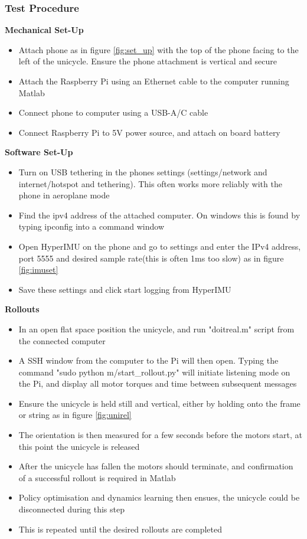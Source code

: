 \documentclass[twoside,twocolumn,12pt]{article}
\begin{document}
\subsubsection{Test Procedure}

\textbf{Mechanical Set-Up}
\begin{itemize}
\item Attach phone as in figure \ref{fig:set_up} with the top of the phone facing to the left of the unicycle. Ensure the phone attachment is vertical and secure
\item Attach the Raspberry Pi using an Ethernet cable to the computer running Matlab
\item Connect phone to computer using a USB-A/C cable
\item Connect Raspberry Pi to 5V power source, and attach on board battery
\end{itemize}

\textbf{Software Set-Up}
\begin{itemize}
\item Turn on USB tethering in the phones settings (settings/network and internet/hotspot and tethering). This often works more reliably with the phone in aeroplane mode
\item Find the ipv4 address of the attached computer. On windows this is found by typing ipconfig into a command window
\item Open HyperIMU on the phone and go to settings and enter the IPv4 address, port 5555 and desired sample rate(this is often 1ms too slow) as in figure \ref{fig:imuset}
\item Save these settings and click start logging from HyperIMU
\end{itemize}
\textbf{Rollouts}
\begin{itemize}
\item In an open flat space position the unicycle, and run "doitreal.m" script from the connected computer
\item A SSH window from the computer to the Pi will then open. Typing the command "sudo python m/start\_rollout.py" will initiate listening mode on the Pi, and display all motor torques and time between subsequent messages
\item Ensure the unicycle is held still and vertical, either by holding onto the frame or string as in figure \ref{fig:unirel}
\item The orientation is then measured for a few seconds before the motors start, at this point the unicycle is released
\item After the unicycle has fallen the motors should terminate, and confirmation of a successful rollout is required in Matlab 
\item Policy optimisation and dynamics learning then ensues, the unicycle could be disconnected during this step
\item This is repeated until the desired rollouts are completed
\end{itemize}
\end{document}
